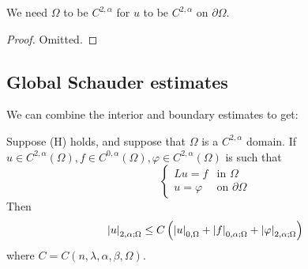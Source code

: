 \documentclass{article}
\begin{document}
\begin{remark}
    We need \(\Omega\) to be \(C^{2, \alpha}\) for \(u\) to be \(C^{2, \alpha}\) on \(\partial\Omega\).
\end{remark}

\begin{proof}
    Omitted.


\end{proof}

\subsection{Global Schauder estimates}

We can combine the interior and boundary estimates to get:

\begin{theorem}

    Suppose (H) holds, and suppose that \(\Omega\) is a \(C^{2, \alpha}\) domain. If \(u \in C^{2, \alpha}(\Omega), f \in C^{0, \alpha}(\Omega), \varphi \in C^{2, \alpha}(\Omega)\) is such that
    \[\begin{cases}
        Lu = f &\text{in }\Omega \\
        u = \varphi &\text{on }\partial\Omega
    \end{cases}\]
    Then
    \[\abs{u}_{2, \alpha; \Omega} \le C\left(\abs{u}_{0, \Omega} + \abs{f}_{0, \alpha; \Omega} + \abs{\varphi}_{2, \alpha; \Omega}\right)\]
    where \(C = C(n, \lambda, \alpha, \beta, \Omega)\).
\end{theorem}
\end{document}
